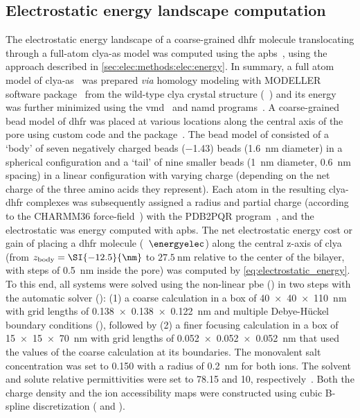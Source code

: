 \subsection{Electrostatic energy landscape computation}
%
The electrostatic energy landscape of a coarse-grained \gls{dhfr} molecule translocating through a full-atom
\gls{clya-as} model was computed using the \gls{apbs}~\cite{Baker-2001}, using the approach described in
\cref{sec:elec:methods:elec:energy}. In summary, a full atom model of \gls{clya-as}~\cite{Franceschini-2016}
was prepared \textit{via} homology modeling with MODELLER software package~\cite{Sali-1993} from the wild-type
\gls{clya} crystal structure (~\cite{Mueller-2009}) and its energy was further minimized using the
\gls{vmd}~\cite{Humphrey-1996} and \gls{namd} programs~\cite{Phillips-2005}. A coarse-grained bead model of
\gls{dhfr} was placed at various locations along the central axis of the pore using custom  code
and the  package~\cite{Cock-2009}. The bead model of \DHFRt{} consisted of a `body' of seven
negatively charged beads  (\SI{-1.43}{\ec}) beads (\SI{1.6}{\nm} diameter) in a spherical configuration and a
`tail' of nine smaller beads (\SI{1}{\nm} diameter, \SI{0.6}{\nm} spacing) in a linear configuration with
varying charge (depending on the net charge of the three amino acids they represent). Each atom in the
resulting \gls{clya}-\gls{dhfr} complexes was subsequently assigned a radius and partial charge (according to
the CHARMM36 force-field~\cite{Huang-2013}) with the PDB2PQR program~\cite{Dolinsky-2004,Dolinsky-2007}, and
the electrostatic was energy computed with \gls{apbs}. The net electrostatic energy cost or gain of placing a
\gls{dhfr} molecule (\ie~$\energyelec$) along the central z-axis of \gls{clya} (from
$z_{\rm{body}}=\SI{-12.5}{\nm}$ to $\SI{27.5}{\nm}$ relative to the center of the bilayer, with steps of
\SI{0.5}{\nm} inside the pore) was computed by \cref{eq:electrostatic_energy}. To this end, all systems were
solved using the non-linear \gls{pbe} () in two steps with the automatic solver ():
(1) a coarse calculation in a box of \SI{40x40x110}{\nm} with grid lengths of \SI{0.138x0.138x0.122}{\nm} and
multiple Debye-H\"{u}ckel boundary conditions (), followed by (2) a finer focusing calculation
in a box of \SI{15x15x70}{\nm} with grid lengths of \SI{0.052x0.052x0.052}{\nm} that used the values of the
coarse calculation at its boundaries. The monovalent salt concentration was set to \SI{0.150}{\Molar} with a
radius of \SI{0.2}{\nm} for both ions. The solvent and solute relative permittivities were set to \num{78.15}
and \num{10}, respectively~\cite{Li-2013}. Both the charge density and the ion accessibility maps were
constructed using cubic B-spline discretization ( and ).


